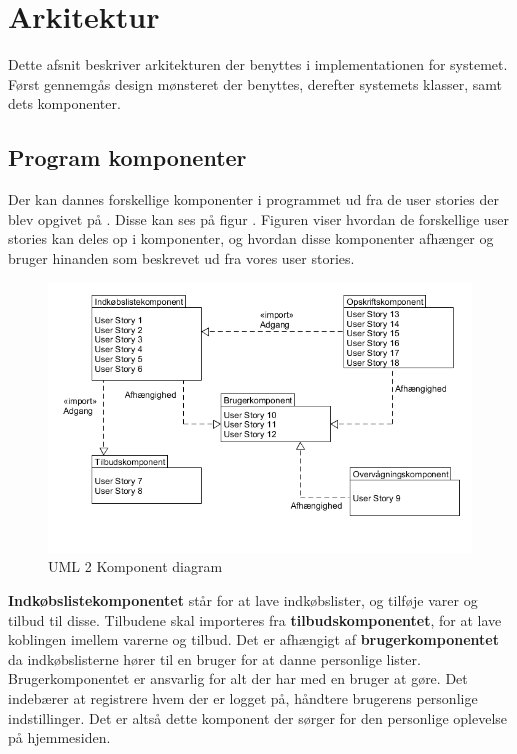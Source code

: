 \section{Arkitektur}
Dette afsnit beskriver arkitekturen der benyttes i implementationen for systemet.
Først gennemgås design mønsteret der benyttes, derefter systemets klasser, samt dets komponenter.




\subsection{Program komponenter}\label{subsec:komp}

Der kan dannes forskellige komponenter i programmet ud fra de user stories der blev opgivet på .
Disse kan ses på figur .
Figuren viser hvordan de forskellige user stories kan deles op i komponenter, og hvordan disse komponenter afhænger og bruger hinanden som beskrevet ud fra vores user stories.

\begin{figure}

	\vspace{-20pt}
	\begin{center}
		\includegraphics[scale=0.6]{images/Diagrams/Komponenter.png}
	\end{center}
	\vspace{-20pt}
	\caption{UML 2 Komponent diagram }
	\label{figure:komp}
	\vspace{-20pt}
\end{figure}

\textbf{Indkøbslistekomponentet} står for at lave indkøbslister, og tilføje varer og tilbud til disse.
Tilbudene skal importeres fra \textbf{tilbudskomponentet}, for at lave koblingen imellem varerne og tilbud.
Det er afhængigt af \textbf{brugerkomponentet} da indkøbslisterne hører til en bruger for at danne personlige lister. Brugerkomponentet er ansvarlig for alt der har med en bruger at gøre. Det indebærer at registrere hvem der er logget på, håndtere brugerens personlige indstillinger. Det er altså dette komponent der sørger for den personlige oplevelse på hjemmesiden.

